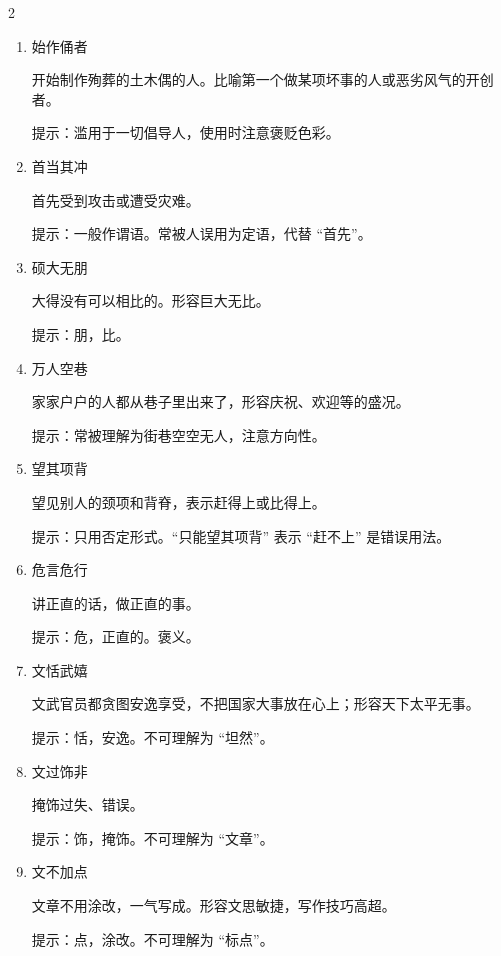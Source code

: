 \documentclass[final,oneside]{ctexbook}
\begin{document}
\begin{multicols}{2}
\begin{enumerate}
      拾取别人的只言片语作为自己的话来说，多用来形容一味重复别人而缺乏主见。

      提示：使用时注意褒贬色彩。

    \item 始作俑者

      开始制作殉葬的土木偶的人。比喻第一个做某项坏事的人或恶劣风气的开创者。

      提示：滥用于一切倡导人，使用时注意褒贬色彩。

    \item 首当其冲

      首先受到攻击或遭受灾难。

      提示：一般作谓语。常被人误用为定语，代替 “首先”。

    \item 硕大无朋

      大得没有可以相比的。形容巨大无比。

      提示：朋，比。

    \item 万人空巷

      家家户户的人都从巷子里出来了，形容庆祝、欢迎等的盛况。

      提示：常被理解为街巷空空无人，注意方向性。

    \item 望其项背

      望见别人的颈项和背脊，表示赶得上或比得上。

      提示：只用否定形式。“只能望其项背” 表示 “赶不上” 是错误用法。

    \item 危言危行

      讲正直的话，做正直的事。

      提示：危，正直的。褒义。

    \item 文恬武嬉

      文武官员都贪图安逸享受，不把国家大事放在心上；形容天下太平无事。

      提示：恬，安逸。不可理解为 “坦然”。

    \item 文过饰非

      掩饰过失、错误。

      提示：饰，掩饰。不可理解为 “文章”。

    \item 文不加点

      文章不用涂改，一气写成。形容文思敏捷，写作技巧高超。

      提示：点，涂改。不可理解为 “标点”。


\end{enumerate}
\end{multicols}
\end{document}
